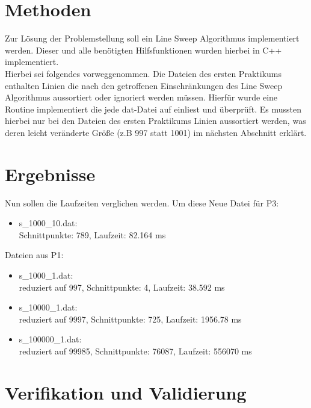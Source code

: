 \documentclass[12pt]{scrartcl}
\begin{document}
\section{Methoden}
Zur Lösung der Problemstellung soll ein Line Sweep Algorithmus implementiert werden. 
Dieser und alle benötigten Hilfsfunktionen wurden hierbei in C++ implementiert.\\
Hierbei sei folgendes vorweggenommen. Die Dateien des ersten Praktikums enthalten Linien die nach den getroffenen Einschränkungen des Line Sweep Algorithmus
aussortiert oder ignoriert werden müssen. Hierfür wurde eine Routine implementiert die jede dat-Datei auf einliest und überprüft. 
Es mussten hierbei nur bei den Dateien des ersten Praktikums Linien aussortiert werden, was deren leicht veränderte Größe (z.B 997 statt 1001) 
im nächsten Abschnitt erklärt.


\section{Ergebnisse}
Nun sollen die Laufzeiten verglichen werden. Um diese
Neue Datei für P3: 
\begin{itemize}
    \item s\_1000\_10.dat: \\Schnittpunkte: 789, Laufzeit: 82.164 ms
\end{itemize}

Dateien aus P1:\\
\begin{itemize}
    \item s\_1000\_1.dat:   \\reduziert auf 997, Schnittpunkte: 4, Laufzeit: 38.592 ms
    \item s\_10000\_1.dat:  \\reduziert auf 9997, Schnittpunkte: 725, Laufzeit: 1956.78 ms
    \item s\_100000\_1.dat: \\reduziert auf 99985, Schnittpunkte: 76087, Laufzeit: 556070 ms
\end{itemize}



\section{Verifikation und Validierung}
\end{document}
